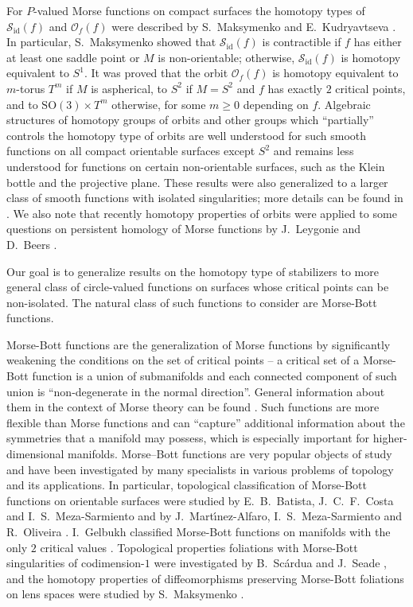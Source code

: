 \documentclass[10pt,reqno]{amsart}
\newcommand{\Sid}{\mathcal{S}_{\id}(f)}
\newcommand{\id}{\mathrm{id}}
\begin{document}
For   $P$-valued Morse functions on compact surfaces the homotopy types of $\Sid$ and $\mathcal{O}_f(f)$ were described by S.~Maksymenko \cite{Maksymenko:AGAG:2006} and E.~Kudryavtseva \cite{Kudryavtseva:MathNotes:2012, Kudryavtseva:MatSb:2013}. 
In particular,
 S.~Maksymenko showed that $\Sid$ is contractible if  $f$ has either  at least one saddle point or $M$ is non-orientable; otherwise, $\Sid$ is homotopy equivalent to $S^1$.
It was proved that the orbit $\mathcal{O}_f(f)$ is homotopy equivalent to $m$-torus $T^m$ if $M$ is aspherical, to $S^2$ if $M = S^2$ and $f$ has exactly $2$ critical points, and to $\mathrm{SO}(3)\times T^m$ otherwise, for some $m\geq 0$  depending on $f$. 
Algebraic structures of homotopy groups of orbits and other groups which ``partially'' controls the homotopy type of orbits are well understood for such smooth functions on all compact orientable surfaces except $S^2$ and  remains less understood for functions on certain non-orientable surfaces, such as the Klein bottle and the projective plane.
These results were also generalized to a larger class of smooth functions with isolated singularities;
 more details  can be found in  \cite{Maksymenko:2021:review}.
We  also note that recently homotopy properties of orbits were applied to some questions on persistent homology of Morse functions  by J.~Leygonie and D.~Beers \cite{LeygonieBeers:JACT:2023}.




Our  goal is to generalize results on the homotopy type of stabilizers to more general class
of circle-valued functions on surfaces whose critical points can be non-isolated. The natural class of such functions to consider are Morse-Bott functions.

Morse-Bott functions are the generalization of Morse functions by significantly weakening the conditions on the set of critical points -- a critical set of a Morse-Bott function is a union of submanifolds and each connected component of such union is  ``non-degenerate in the normal direction''. General information about them in the context of Morse theory can be found \cite{Nicolaescu:MorseTh:2011}. 
Such functions are more flexible than Morse functions and can ``capture'' additional information about the symmetries that a manifold may possess, which is especially important for higher-dimensional manifolds.
Morse–Bott functions are  very popular objects of study and have been investigated by many specialists in various problems of topology and its applications.
In particular,
topological classification of Morse-Bott functions on orientable surfaces were studied by  E.~B.~Batista, J.~C.~F.~Costa and I.~S.~Meza-Sarmiento \cite{BatistaCostaMeza:2022} and by J.~Mart\'{\i}nez-Alfaro, I.~S.~Meza-Sarmiento  and R.~Oliveira  \cite{MartinezMezaOliveria:2016}. I.~Gelbukh classified Morse-Bott functions on manifolds with the only $2$  critical values
\cite{Gelbukh:Czechoslovak:2021}. Topological properties foliations with Morse-Bott singularities of codimension-$1$ were investigated  by B.~Sc\'{a}rdua and J.~Seade 
\cite{ScarduaSeade:DGeom:2009,ScarduaSeade:Topol:2011}, and the homotopy properties of diffeomorphisms preserving Morse-Bott foliations on lens spaces were studied by S.~Maksymenko \cite{Maksymenko:2023:MBFol2:2023,MaksymenkoKhokhliuk:2022:MBFol:2022}.
\end{document}
